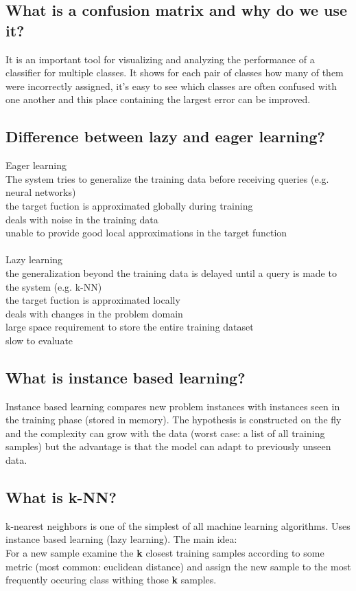 \documentclass[12pt]{scrartcl}
\begin{document}
\subsection{What is a confusion matrix and why do we use it?}
It is an important tool for visualizing and analyzing the performance of a classifier for multiple classes. It shows for each pair of classes how many of them were incorrectly assigned, it's easy to see which classes are often confused with one another and this place containing the largest error can be improved.

\subsection{Difference between lazy and eager learning?}
Eager learning \\
The system tries to generalize the training data before receiving queries (e.g. neural networks) \\
{\color{ForestGreen} the target fuction is approximated globally during training } \\
{\color{ForestGreen} deals with noise in the training data} \\
{\color{red} unable to provide good local approximations in the target function} \\
\\
Lazy learning \\
the generalization beyond the training data is delayed until a query is made to the system (e.g. k-NN) \\
{\color{ForestGreen} the target fuction is approximated locally } \\
{\color{ForestGreen} deals with changes in the problem domain} \\
{\color{red} large space requirement to store the entire training dataset} \\ 
{\color{red} slow to evaluate }

\subsection{What is instance based learning?}
Instance based learning compares new problem instances with instances seen in the training phase (stored in memory). The hypothesis is constructed on the fly and the complexity can grow with the data (worst case: a list of all training samples) but the advantage is that the model can adapt to previously unseen data.

\subsection{What is k-NN?}
k-nearest neighbors is one of the simplest of all machine learning algorithms. Uses instance based learning (lazy learning). The main idea: \\
For a new sample examine the {\bf k} closest training samples according to some metric (most common: euclidean distance) and assign the new sample to the most frequently occuring class withing those {\bf k} samples.
\end{document}
